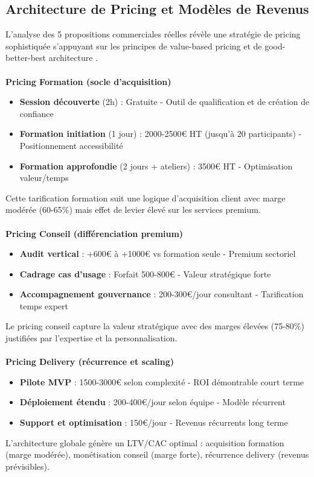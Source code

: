 \subsection{Architecture de Pricing et Modèles de Revenus}

L'analyse des 5 propositions commerciales réelles \cite{luwai2025aesio,luwai2025antilogy,luwai2025integrhale,luwai2025carecall,luwai2025tectona} révèle une stratégie de pricing sophistiquée s'appuyant sur les principes de value-based pricing et de good-better-best architecture \cite{nagle2011strategy}.
\\\\
\textbf{Pricing Formation (socle d'acquisition)}
\begin{itemize}
    \item \textbf{Session découverte} (2h) : Gratuite - Outil de qualification et de création de confiance
    \item \textbf{Formation initiation} (1 jour) : 2000-2500€ HT (jusqu'à 20 participants) - Positionnement accessibilité
    \item \textbf{Formation approfondie} (2 jours + ateliers) : 3500€ HT - Optimisation valeur/temps
\end{itemize}
\medskip
Cette tarification formation suit une logique d'acquisition client avec marge modérée (60-65\%) mais effet de levier élevé sur les services premium.
\\\\
\textbf{Pricing Conseil (différenciation premium)}
\begin{itemize}
    \item \textbf{Audit vertical} : +600€ à +1000€ vs formation seule - Premium sectoriel
    \item \textbf{Cadrage cas d'usage} : Forfait 500-800€ - Valeur stratégique forte
    \item \textbf{Accompagnement gouvernance} : 200-300€/jour consultant - Tarification temps expert
\end{itemize}
\medskip
Le pricing conseil capture la valeur stratégique avec des marges élevées (75-80\%) justifiées par l'expertise et la personnalisation.
\\\\
\textbf{Pricing Delivery (récurrence et scaling)}
\begin{itemize}
    \item \textbf{Pilote MVP} : 1500-3000€ selon complexité - ROI démontrable court terme
    \item \textbf{Déploiement étendu} : 200-400€/jour selon équipe - Modèle récurrent
    \item \textbf{Support et optimisation} : 150€/jour - Revenus récurrents long terme
\end{itemize}
\medskip
L'architecture globale génère un LTV/CAC optimal : acquisition formation (marge modérée), monétisation conseil (marge forte), récurrence delivery (revenus prévisibles).

